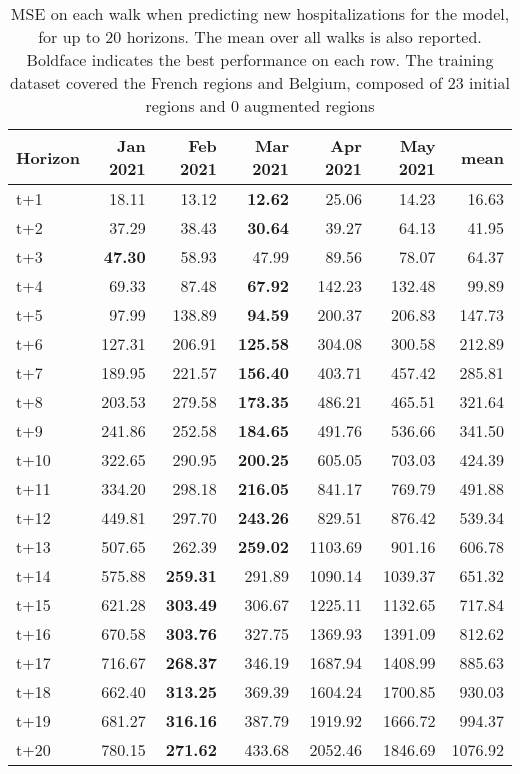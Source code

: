 \begin{table}[H]
\centering
\caption{MSE on each walk when predicting new hospitalizations for the model, for up to 20 horizons. The mean over all walks is also reported. Boldface indicates the best performance on each row. The training dataset covered the French regions and Belgium, composed of 23 initial regions and 0 augmented regions }
\label{tab:MSE_walk_dense_model}
\begin{tabular}{lrrrrrr}
\toprule
Horizon &  Jan 2021 &  Feb 2021 &  Mar 2021 &  Apr 2021 &  May 2021 &    mean \\
\midrule
t+1  & 18.11  & 13.12  & \textbf{12.62}  & 25.06  & 14.23  & 16.63  \\
t+2  & 37.29  & 38.43  & \textbf{30.64}  & 39.27  & 64.13  & 41.95  \\
t+3  & \textbf{47.30}  & 58.93  & 47.99  & 89.56  & 78.07  & 64.37  \\
t+4  & 69.33  & 87.48  & \textbf{67.92}  & 142.23  & 132.48  & 99.89  \\
t+5  & 97.99  & 138.89  & \textbf{94.59}  & 200.37  & 206.83  & 147.73  \\
t+6  & 127.31  & 206.91  & \textbf{125.58}  & 304.08  & 300.58  & 212.89  \\
t+7  & 189.95  & 221.57  & \textbf{156.40}  & 403.71  & 457.42  & 285.81  \\
t+8  & 203.53  & 279.58  & \textbf{173.35}  & 486.21  & 465.51  & 321.64  \\
t+9  & 241.86  & 252.58  & \textbf{184.65}  & 491.76  & 536.66  & 341.50  \\
t+10  & 322.65  & 290.95  & \textbf{200.25}  & 605.05  & 703.03  & 424.39  \\
t+11  & 334.20  & 298.18  & \textbf{216.05}  & 841.17  & 769.79  & 491.88  \\
t+12  & 449.81  & 297.70  & \textbf{243.26}  & 829.51  & 876.42  & 539.34  \\
t+13  & 507.65  & 262.39  & \textbf{259.02}  & 1103.69  & 901.16  & 606.78  \\
t+14  & 575.88  & \textbf{259.31}  & 291.89  & 1090.14  & 1039.37  & 651.32  \\
t+15  & 621.28  & \textbf{303.49}  & 306.67  & 1225.11  & 1132.65  & 717.84  \\
t+16  & 670.58  & \textbf{303.76}  & 327.75  & 1369.93  & 1391.09  & 812.62  \\
t+17  & 716.67  & \textbf{268.37}  & 346.19  & 1687.94  & 1408.99  & 885.63  \\
t+18  & 662.40  & \textbf{313.25}  & 369.39  & 1604.24  & 1700.85  & 930.03  \\
t+19  & 681.27  & \textbf{316.16}  & 387.79  & 1919.92  & 1666.72  & 994.37  \\
t+20  & 780.15  & \textbf{271.62}  & 433.68  & 2052.46  & 1846.69  & 1076.92  \\

\bottomrule
\end{tabular}
\end{table}
